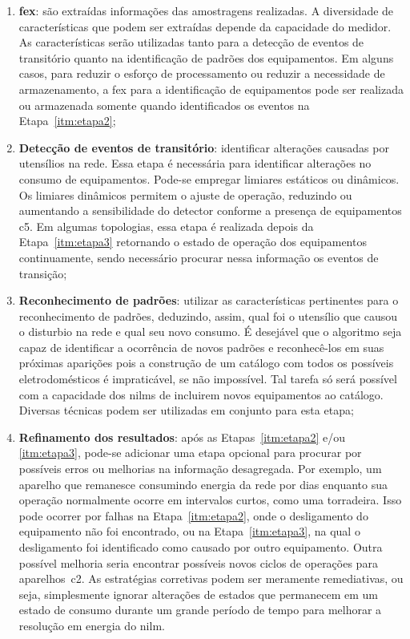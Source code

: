 \begin{enumerate}
\item\label{itm:etapa1} \textbf{\gls{fex}}: são extraídas
informações das amostragens realizadas. A diversidade de
características que podem ser extraídas depende da capacidade do
medidor. As características serão utilizadas tanto para a detecção de
eventos de transitório quanto na identificação de padrões dos
equipamentos. Em alguns casos, para reduzir o esforço de processamento
ou reduzir a necessidade de armazenamento, a \gls{fex} para a
identificação de equipamentos pode ser realizada ou armazenada somente
quando identificados os eventos na Etapa~\ref{itm:etapa2};
\item\label{itm:etapa2}\textbf{Detecção de eventos de
transitório}: identificar alterações causadas por utensílios na rede.
Essa etapa é necessária para identificar alterações no consumo de
equipamentos. Pode-se empregar limiares estáticos ou dinâmicos. Os
limiares dinâmicos permitem o ajuste de operação, reduzindo ou
aumentando a sensibilidade do detector conforme a presença de
equipamentos \acrshort{c5}. Em algumas topologias, essa etapa é realizada
depois da Etapa~\ref{itm:etapa3} retornando o estado de operação dos
equipamentos continuamente, sendo necessário procurar nessa informação
os eventos de transição;
\item\label{itm:etapa3}\textbf{Reconhecimento de padrões}: utilizar as
características pertinentes para o reconhecimento de padrões,
deduzindo, assim, qual foi o utensílio que causou o disturbio na rede
e qual seu novo consumo. É desejável que o algoritmo seja capaz de identificar
a ocorrência de novos padrões e reconhecê-los em suas próximas 
aparições pois a construção de um catálogo com todos os possíveis
eletrodomésticos é impraticável, se não impossível. Tal tarefa só será
possível com a capacidade dos \glspl{nilm} de incluirem novos
equipamentos ao catálogo. Diversas técnicas podem ser utilizadas em
conjunto para esta etapa;
\item\label{itm:etapa4}\textbf{Refinamento dos resultados}: após as
Etapas~\ref{itm:etapa2} e/ou \ref{itm:etapa3}, pode-se adicionar uma
etapa opcional para procurar por possíveis erros ou melhorias na
informação desagregada. Por exemplo, um aparelho que remanesce
consumindo energia da rede por dias enquanto sua operação normalmente
ocorre em intervalos curtos, como uma torradeira. Isso pode ocorrer
por falhas na Etapa~\ref{itm:etapa2}, onde o desligamento do
equipamento não foi encontrado, ou na Etapa~\ref{itm:etapa3}, na qual
o desligamento foi identificado como causado por outro equipamento.
Outra possível melhoria seria encontrar possíveis novos ciclos de
operações para aparelhos~\gls{c2}. As estratégias corretivas podem ser
meramente remediativas, ou seja, simplesmente ignorar alterações de
estados que permanecem em um estado de consumo durante um grande
período de tempo para melhorar a resolução em energia do \gls{nilm}.
\end{enumerate}

